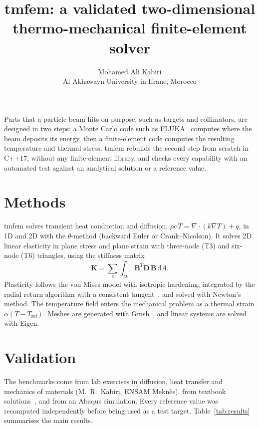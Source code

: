 \documentclass[11pt,a4paper]{article}
\title{tmfem: a validated two-dimensional thermo-mechanical finite-element solver}
\author{Mohamed Ali Kabiri\\Al Akhawayn University in Ifrane, Morocco}
\date{}
\begin{document}
\maketitle

\noindent
Parts that a particle beam hits on purpose, such as targets and collimators, are designed in two
steps: a Monte Carlo code such as FLUKA~\cite{fluka2005} computes where the beam deposits its energy,
then a finite-element code computes the resulting temperature and thermal stress. tmfem rebuilds the
second step from scratch in C++17, without any finite-element library, and checks every capability
with an automated test against an analytical solution or a reference value.

\section{Methods}

tmfem solves transient heat conduction and diffusion, $\rho c\,\dot T = \nabla\cdot(k\nabla T) + q$,
in 1D and 2D with the $\theta$-method (backward Euler or Crank--Nicolson). It solves 2D linear
elasticity in plane stress and plane strain with three-node (T3) and six-node (T6) triangles, using
the stiffness matrix
\begin{equation}
\mathbf K = \sum_e \int_{\Omega_e} \mathbf B^T \mathbf D\, \mathbf B \,\mathrm dA .
\end{equation}
Plasticity follows the von Mises model with isotropic hardening, integrated by the radial return
algorithm with a consistent tangent~\cite{simo_hughes}, and solved with Newton's method. The
temperature field enters the mechanical problem as a thermal strain $\alpha(T - T_\text{ref})$.
Meshes are generated with Gmsh~\cite{gmsh}, and linear systems are solved with Eigen.

\section{Validation}

The benchmarks come from lab exercises in diffusion, heat transfer and mechanics of materials
(M.~R.~Kabiri, ENSAM Mekn\`es), from textbook solutions~\cite{crank,timoshenko_goodier}, and from an
Abaqus simulation. Every reference value was recomputed independently before being used as a test
target. Table~\ref{tab:results} summarises the main results.
\end{document}
